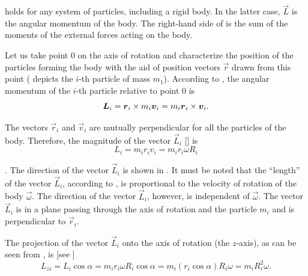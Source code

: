 \noindent
holds for any system of particles, including a rigid body. In the latter case, $\vec{L}$ is the angular momentum of the body. The right-hand side of  is the sum of the moments of the external forces acting on the body.

Let us take point $0$ on the axis of rotation and characterize the position of the particles forming the body with the aid of position vectors $\vec{r}$ drawn from this point ( depicts the $i$-th particle of mass $m_1$). According to , the angular momentum of the $i$-th particle relative to point $0$ is
\begin{equation}\label{eq:5_7}
\boldsymbol{L}_i = \boldsymbol{r}_i \times m_i\boldsymbol{v}_i = m_i\boldsymbol{r}_{i}\times\boldsymbol{v}_{i}.
\end{equation}

\noindent
The vectors $\vec{r}_i$ and $\vec{v}_i$ are mutually perpendicular for all the particles of the body. Therefore, the magnitude of the vector $\vec{L}_i$ [] is
\begin{equation}\label{eq:5_8}
L_i = m_i r_i v_i = m_i r_i \omega R_i
\end{equation}

. The direction of the vector $\vec{L}_i$ is shown in . It must be noted that the ``length'' of the vector $\vec{L}_i$, according to , is proportional to the velocity of rotation of the body $\vec{\omega}$. The direction of the vector $\vec{L}_i$, however, is independent of $\vec{\omega}$. The vector $\vec{L}_i$ is in a plane passing through the axis of rotation and the particle $m_i$ and is perpendicular to $\vec{r}_i$.

The projection of the vector $\vec{L}_i$ onto the axis of rotation (the $z$-axis), as can be seen from , is [see ]
\begin{equation}\label{eq:5_9}
L_{zi} = L_i\cos\alpha = m_i r_i \omega R_i \cos\alpha = m_i(r_i\cos\alpha)R_i\omega = m_iR_i^2\omega.
\end{equation}

